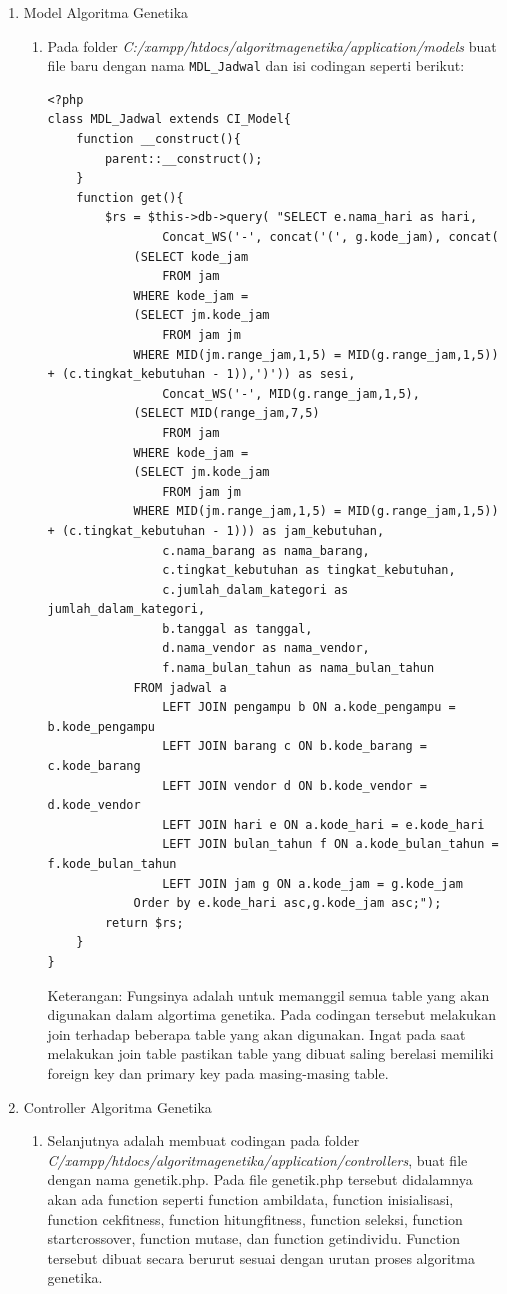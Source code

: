 \begin{enumerate}
    \item Model Algoritma Genetika
    
    \begin{enumerate}
        \item Pada folder \textit{C:/xampp/htdocs/algoritmagenetika/application/models} buat file baru dengan nama \verb|MDL_Jadwal| dan isi codingan seperti berikut:
        
\begin{lstlisting}
<?php
class MDL_Jadwal extends CI_Model{
	function __construct(){
		parent::__construct();
	}
    function get(){
		$rs = $this->db->query(	"SELECT e.nama_hari as hari, 
				Concat_WS('-', concat('(', g.kode_jam), concat( 
			(SELECT kode_jam
				FROM jam
			WHERE kode_jam = 
			(SELECT jm.kode_jam 
				FROM jam jm
			WHERE MID(jm.range_jam,1,5) = MID(g.range_jam,1,5)) + (c.tingkat_kebutuhan - 1)),')')) as sesi,
				Concat_WS('-', MID(g.range_jam,1,5),
			(SELECT MID(range_jam,7,5)
				FROM jam
			WHERE kode_jam = 
			(SELECT jm.kode_jam
				FROM jam jm
			WHERE MID(jm.range_jam,1,5) = MID(g.range_jam,1,5)) + (c.tingkat_kebutuhan - 1))) as jam_kebutuhan,
				c.nama_barang as nama_barang,
				c.tingkat_kebutuhan as tingkat_kebutuhan,
				c.jumlah_dalam_kategori as jumlah_dalam_kategori,
				b.tanggal as tanggal,
				d.nama_vendor as nama_vendor,
				f.nama_bulan_tahun as nama_bulan_tahun
			FROM jadwal a
				LEFT JOIN pengampu b ON a.kode_pengampu = b.kode_pengampu
				LEFT JOIN barang c ON b.kode_barang = c.kode_barang
				LEFT JOIN vendor d ON b.kode_vendor = d.kode_vendor
				LEFT JOIN hari e ON a.kode_hari = e.kode_hari
				LEFT JOIN bulan_tahun f ON a.kode_bulan_tahun = f.kode_bulan_tahun
				LEFT JOIN jam g ON a.kode_jam = g.kode_jam
			Order by e.kode_hari asc,g.kode_jam asc;");
		return $rs;
	}
}
\end{lstlisting}
		\par Keterangan: Fungsinya adalah untuk memanggil semua table yang akan digunakan dalam algortima genetika. Pada codingan tersebut melakukan join terhadap beberapa table yang akan digunakan. Ingat pada saat melakukan join table pastikan table yang dibuat saling berelasi memiliki foreign key dan primary key pada masing-masing table.
    \end{enumerate}
		
    \item Controller Algoritma Genetika
    \begin{enumerate}
	\item Selanjutnya adalah membuat codingan pada folder \textit{C/xampp/htdocs/algoritmagenetika/application/controllers}, buat file dengan nama genetik.php. Pada file genetik.php tersebut didalamnya akan ada function seperti function ambildata, function inisialisasi, function cekfitness, function hitungfitness, function seleksi, function startcrossover, function mutase, dan function getindividu. Function tersebut dibuat secara berurut sesuai dengan urutan proses algoritma genetika.
	

\end{enumerate}
\end{enumerate}
